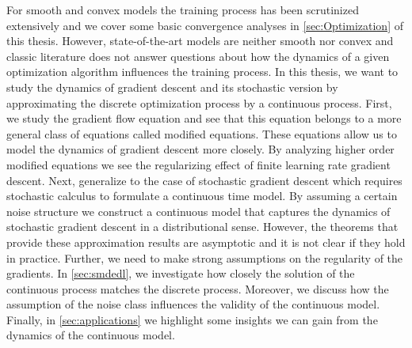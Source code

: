 \documentclass[12pt]{article}
\theoremstyle{definition}
\numberwithin{equation}{section}
\begin{document}
For smooth and convex models the training process has been scrutinized extensively and we cover some basic convergence analyses in \autoref{sec:Optimization} of this thesis. However, state-of-the-art models are neither smooth nor convex and classic literature does not answer questions about how the dynamics of a given optimization algorithm influences the training process. In this thesis, we want to study the dynamics of gradient descent and its stochastic version by approximating the discrete optimization process by a continuous process. First, we study the gradient flow equation and see that this equation belongs to a more general class of equations called modified equations. These equations allow us to model the dynamics of gradient descent more closely. By analyzing higher order modified equations we see the regularizing effect of finite learning rate gradient descent. Next, generalize to the case of stochastic gradient descent which requires stochastic calculus to formulate a continuous time model. By assuming a certain noise structure we construct a continuous model that captures the dynamics of stochastic gradient descent in a distributional sense.
However, the theorems that provide these approximation results are asymptotic and it is not clear if they hold in practice. Further, we need to make strong assumptions on the regularity of the gradients. In \autoref{sec:smdedl}, we investigate how closely the solution of the continuous process matches the discrete process. Moreover, we discuss how the assumption of the noise class influences the validity of the continuous model.
Finally, in \autoref{sec:applications} we highlight some insights we can gain from the dynamics of the continuous model.
\end{document}
